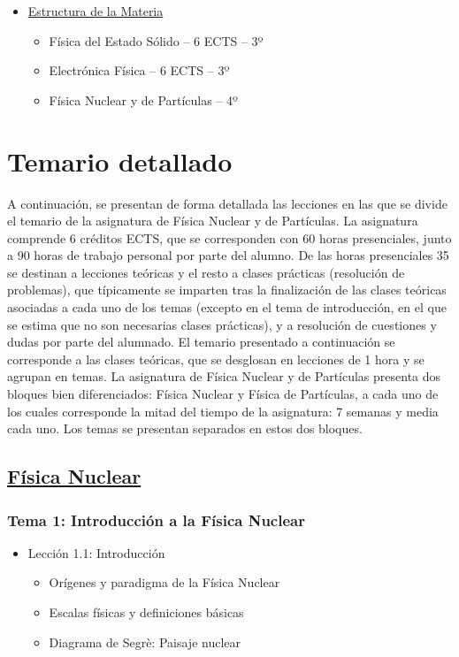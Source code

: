 \documentclass[a4paper,12pt,twoside]{article}
\begin{document}
\begin{itemize}
\item \underline{Estructura de la Materia}
\begin{itemize}
\item Física del Estado Sólido -- 6 ECTS -- 3º
\item Electrónica Física -- 6 ECTS -- 3º
\item Física Nuclear y de Partículas -- 4º
\end{itemize}
\end{itemize}

\section{Temario detallado \label{sec:temario}}

A continuación, se presentan de forma detallada las lecciones en las que se divide el temario de la asignatura de Física Nuclear y de Partículas. La asignatura comprende 6 créditos ECTS, que se corresponden con 60 horas presenciales, junto a 90 horas de trabajo personal por parte del alumno. De las horas presenciales 35 se destinan a lecciones teóricas y el resto a clases prácticas (resolución de problemas), que típicamente se imparten tras la finalización de las clases teóricas asociadas a cada uno de los temas (excepto en el tema de introducción, en el que se estima que no son necesarias clases prácticas), y a resolución de cuestiones y dudas por parte del alumnado. El temario presentado a continuación se corresponde a las clases teóricas, que se desglosan en lecciones de 1 hora y se agrupan en temas. La asignatura de Física Nuclear y de Partículas presenta dos bloques bien diferenciados: Física Nuclear y Física de Partículas, a cada uno de los cuales corresponde la mitad del tiempo de la asignatura: 7 semanas y media cada uno. Los temas se presentan separados en estos dos bloques.

\subsection*{\underline{Física Nuclear}}

\subsubsection*{Tema 1: Introducción a la Física Nuclear}

\begin{itemize}
\item Lección 1.1: Introducción
\begin{itemize}
\item Orígenes y paradigma de la Física Nuclear
\item Escalas físicas y definiciones básicas
\item Diagrama de Segrè: Paisaje nuclear
\end{itemize}
\end{itemize}
\end{document}
